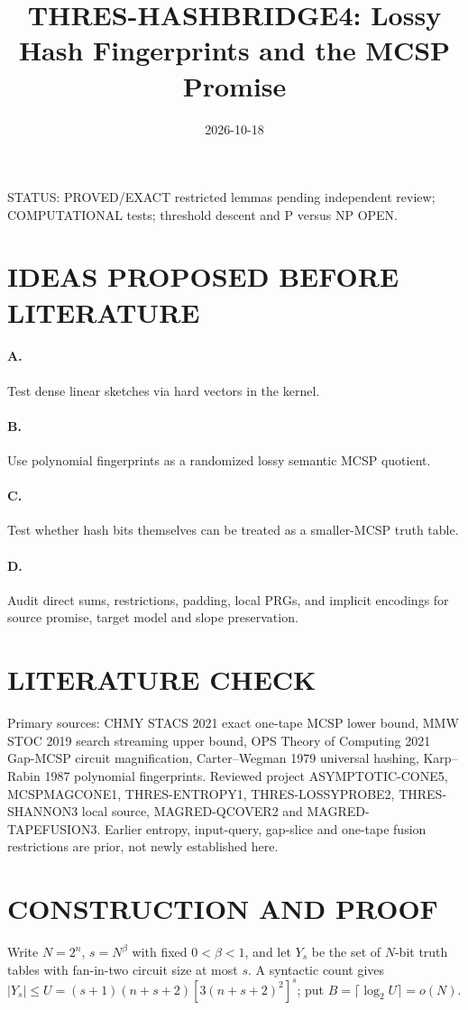 \documentclass{article}
\title{THRES-HASHBRIDGE4: Lossy Hash Fingerprints and the MCSP Promise}
\date{2026-10-18}
\begin{document}
\maketitle
\noindent STATUS: PROVED/EXACT restricted lemmas pending independent review; COMPUTATIONAL tests; threshold descent and P versus NP OPEN.

\section{IDEAS PROPOSED BEFORE LITERATURE}
\paragraph{A.} Test dense linear sketches via hard vectors in the kernel.
\paragraph{B.} Use polynomial fingerprints as a randomized lossy semantic MCSP quotient.
\paragraph{C.} Test whether hash bits themselves can be treated as a smaller-MCSP truth table.
\paragraph{D.} Audit direct sums, restrictions, padding, local PRGs, and implicit encodings for source promise, target model and slope preservation.

\section{LITERATURE CHECK}
Primary sources: CHMY STACS 2021 exact one-tape MCSP lower bound, MMW STOC 2019 search streaming upper bound, OPS Theory of Computing 2021 Gap-MCSP circuit magnification, Carter--Wegman 1979 universal hashing, Karp--Rabin 1987 polynomial fingerprints. Reviewed project ASYMPTOTIC-CONE5, MCSPMAGCONE1, THRES-ENTROPY1, THRES-LOSSYPROBE2, THRES-SHANNON3 local source, MAGRED-QCOVER2 and MAGRED-TAPEFUSION3. Earlier entropy, input-query, gap-slice and one-tape fusion restrictions are prior, not newly established here.

\section{CONSTRUCTION AND PROOF}
Write $N=2^n$, $s=N^\beta$ with fixed $0<\beta<1$, and let $Y_s$ be the set of $N$-bit truth tables with fan-in-two circuit size at most $s$. A syntactic count gives $|Y_s|\le U=(s+1)(n+s+2)[3(n+s+2)^2]^s$; put $B=\lceil\log_2 U\rceil=o(N)$.
\end{document}
